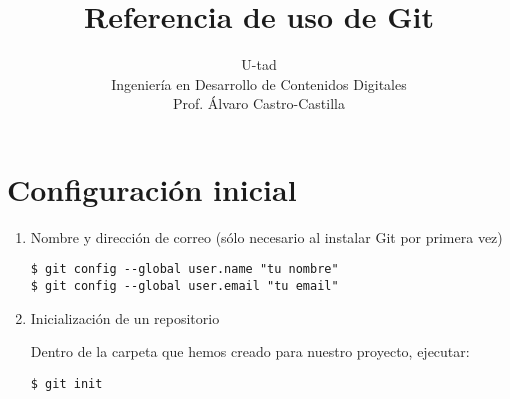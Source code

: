 \documentclass[a4paper,oneside]{article}
\title{Referencia de uso de Git}
\author{U-tad\\ Ingeniería en Desarrollo de Contenidos Digitales\\ Prof. Álvaro Castro-Castilla}
\date{}
\begin{document}
\maketitle


\section{Configuración inicial}
\begin{enumerate}
  \item Nombre y dirección de correo (sólo necesario al instalar Git por primera vez)

    \begin{verbatim}
$ git config --global user.name "tu nombre"
$ git config --global user.email "tu email"
    \end{verbatim}

  \item Inicialización de un repositorio

Dentro de la carpeta que hemos creado para nuestro proyecto, ejecutar:

    \begin{verbatim}
$ git init
    \end{verbatim}
\end{enumerate}
\end{document}
